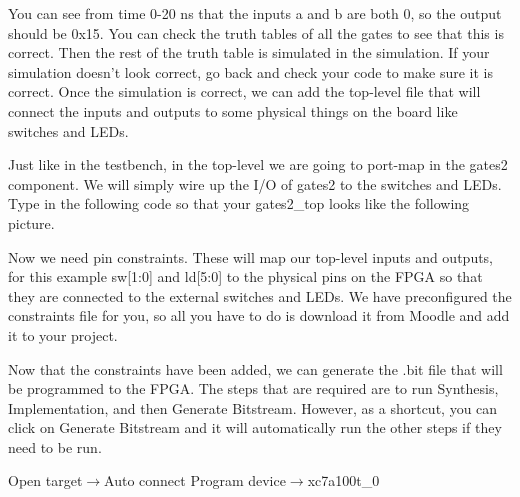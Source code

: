 You can see from time 0-20 ns that the inputs a and b are both 0, so the output should be 0x15.
You can check the truth tables of all the gates to see that this is correct.
Then the rest of the truth table is simulated in the simulation.
If your simulation doesn't look correct, go back and check your code to make sure it is correct.
Once the simulation is correct, we can add the top-level file that will connect the inputs and
outputs to some physical things on the board like switches and LEDs.


Just like in the testbench, in the top-level we are going to port-map in the gates2 component.
We will simply wire up the I/O of gates2 to the switches and LEDs.
Type in the following code so that your gates2\_top looks like the following picture.


Now we need pin constraints.
These will map our top-level inputs and outputs, for this example sw[1:0] and ld[5:0] to the
physical pins on the FPGA so that they are connected to the external switches and LEDs.
We have preconfigured the constraints file for you, so all you have to do is download it from
Moodle and add it to your project.


Now that the constraints have been added, we can generate the .bit file that will be
programmed to the FPGA.
The steps that are required are to run Synthesis, Implementation, and then Generate Bitstream.
However, as a shortcut, you can click on Generate Bitstream and it will automatically run the
other steps if they need to be run.

Open target$\rightarrow$Auto connect
Program device$\rightarrow$xc7a100t\_0


